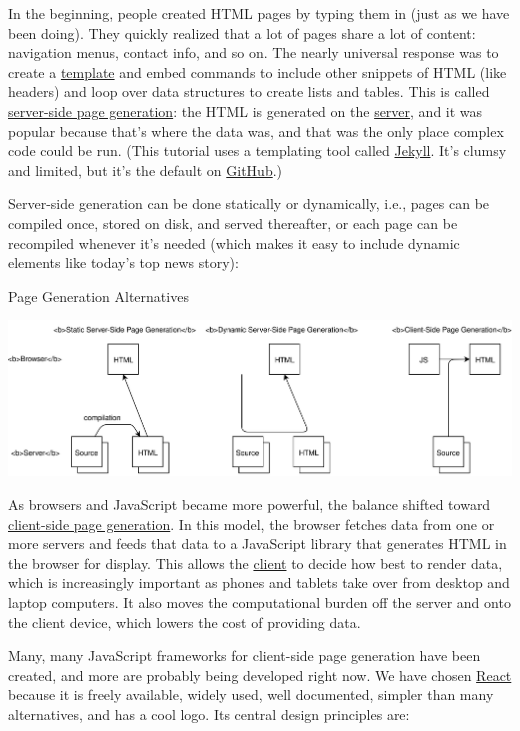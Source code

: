 In the beginning, people created HTML pages by typing them in (just as
we have been doing). They quickly realized that a lot of pages share a
lot of content: navigation menus, contact info, and so on. The nearly
universal response was to create a
\protect\hyperlink{g:template}{template} and embed commands to include
other snippets of HTML (like headers) and loop over data structures to
create lists and tables. This is called
\protect\hyperlink{g:server-side-page-generation}{server-side page
generation}: the HTML is generated on the
\protect\hyperlink{g:server}{server}, and it was popular because that's
where the data was, and that was the only place complex code could be
run. (This tutorial uses a templating tool called
\href{https://jekyllrb.com/}{Jekyll}. It's clumsy and limited, but it's
the default on \href{http://github.com/}{GitHub}.)

Server-side generation can be done statically or dynamically, i.e.,
pages can be compiled once, stored on disk, and served thereafter, or
each page can be recompiled whenever it's needed (which makes it easy to
include dynamic elements like today's top news story):

Page Generation Alternatives

\includegraphics{../../files/dynamic-alternatives.svg}

As browsers and JavaScript became more powerful, the balance shifted
toward \protect\hyperlink{g:client-side-page-generation}{client-side
page generation}. In this model, the browser fetches data from one or
more servers and feeds that data to a JavaScript library that generates
HTML in the browser for display. This allows the
\protect\hyperlink{g:client}{client} to decide how best to render data,
which is increasingly important as phones and tablets take over from
desktop and laptop computers. It also moves the computational burden off
the server and onto the client device, which lowers the cost of
providing data.

Many, many JavaScript frameworks for client-side page generation have
been created, and more are probably being developed right now. We have
chosen \href{https://reactjs.org/}{React} because it is freely
available, widely used, well documented, simpler than many alternatives,
and has a cool logo. Its central design principles are:

